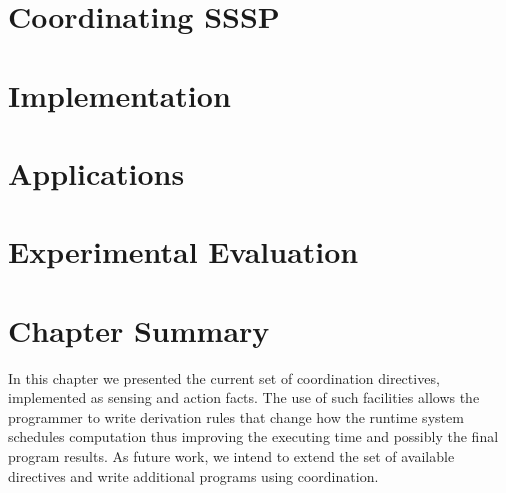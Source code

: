 \section{Coordinating SSSP}


\section{Implementation}


\section{Applications}



\section{Experimental Evaluation}
\section{Chapter Summary}

In this chapter we presented the current set of coordination directives,
implemented as sensing and action facts. The use of such facilities allows the
programmer to write derivation rules that change how the runtime system
schedules computation thus improving the executing time and possibly the final
program results. As future work, we intend to extend the set of available
directives and write additional programs using coordination.

